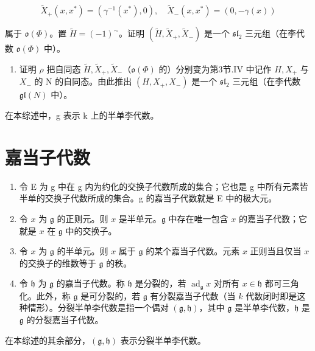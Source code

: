 \[
\tilde {X} _ {+} (x, x ^ {*}) = (\gamma^ {- 1} (x ^ {*}), 0), \quad \tilde {X} _ {-} (x, x ^ {*}) = (0, - \gamma (x))
\]

属于 \(\mathfrak{o}(\varPhi)\)。置 \(\tilde{H} = (-1)^{\sim}\)。证明 \((\tilde{H}, \tilde{X}_{+}, \tilde{X}_{-})\) 是一个 \(\mathfrak{sl}_2\) 三元组（在李代数 \(\mathfrak{o}(\varPhi)\) 中）。

\begin{enumerate}
\def\labelenumi{\alph{enumi})}
\setcounter{enumi}{2}
\tightlist
\item
  证明 \(\rho\) 把自同态 \(\tilde{H}, \tilde{X}_{+}, \tilde{X}_{-}\)（\(\mathfrak{o}(\Phi)\) 的）分别变为第3节.IV 中记作 \(H, X_{+}\) 与 \(X_{-}\) 的 N 的自同态。由此推出 \((H, X_{+}, X_{-})\) 是一个 \(\mathfrak{sl}_{2}\) 三元组（在李代数 \(\mathfrak{gl}(N)\) 中）。
\end{enumerate}


在本综述中，g 表示 k 上的半单李代数。

\section*{嘉当子代数}

\begin{enumerate}
\def\labelenumi{\arabic{enumi})}
\item
  令 E 为 g 中在 g 内为约化的交换子代数所成的集合；它也是 g 中所有元素皆半单的交换子代数所成的集合。g 的嘉当子代数就是 E 中的极大元。
\item
  令 \(x\) 为 \(\mathfrak{g}\) 的正则元。则 \(x\) 是半单元。\(\mathfrak{g}\) 中存在唯一包含 \(x\) 的嘉当子代数；它就是 \(x\) 在 \(\mathfrak{g}\) 中的交换子。
\item
  令 \(x\) 为 \(\mathfrak{g}\) 的半单元。则 \(x\) 属于 \(\mathfrak{g}\) 的某个嘉当子代数。元素 \(x\) 正则当且仅当 \(x\) 的交换子的维数等于 \(\mathfrak{g}\) 的秩。
\item
  令 \(\mathfrak{h}\) 为 \(\mathfrak{g}\) 的嘉当子代数。称 \(\mathfrak{h}\) 是分裂的，若 \(\operatorname{ad}_{\mathfrak{g}}x\) 对所有 \(x \in \mathfrak{h}\) 都可三角化。此外，称 \(\mathfrak{g}\) 是可分裂的，若 \(\mathfrak{g}\) 有分裂嘉当子代数（当 \(k\) 代数闭时即是这种情形）。分裂半单李代数是指一个偶对 \((\mathfrak{g}, \mathfrak{h})\)，其中 \(\mathfrak{g}\) 是半单李代数，\(\mathfrak{h}\) 是 \(\mathfrak{g}\) 的分裂嘉当子代数。
\end{enumerate}

在本综述的其余部分，\((\mathfrak{g},\mathfrak{h})\) 表示分裂半单李代数。

